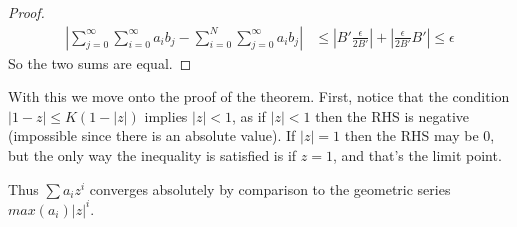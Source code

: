 \documentclass{homework}
\begin{document}
\begin{solution}
\begin{proof}
                                                                             \begin{align*}
                                                                             |\sum_{j=0}^\infty\sum_{i=0}^\infty a_ib_j - \sum_{i=0}^N\sum_{j=0}^\infty a_ib_j| &\leq
                                                                             |B'\frac{\epsilon}{2B'}| +|\frac{\epsilon}{2B'}B'|   \leq \epsilon
                                                                             \end{align*}
                                                                             So the two sums are equal.
                                                                             \end{proof}
                                                                             With this we move onto the proof of the theorem. First, notice that the condition $|1-z|\leq K(1-|z|)$ implies $|z| <  1$, as if $|z| < 1$ then the RHS is negative (impossible since there is an absolute value). If $|z|=1$ then the RHS may be 0, but the only way the inequality is satisfied is if $z=1$, and that's the limit point.

                                                                             Thus $\sum a_iz^i$ converges absolutely by comparison to the geometric series $max(a_i)|z|^i$.


\end{solution}
\end{document}
